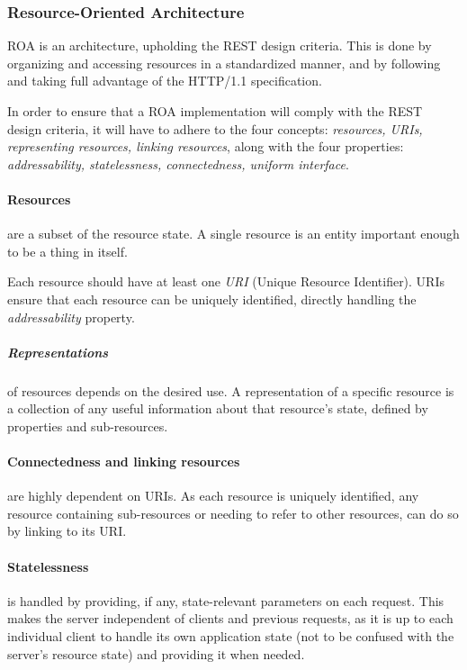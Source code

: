 \subsubsection{Resource-Oriented Architecture}
ROA is an architecture, upholding the REST design criteria.
This is done by organizing and accessing resources in a standardized manner, and by following and taking full advantage of the HTTP/1.1 specification.

In order to ensure that a ROA implementation will comply with the REST design criteria, it will have to adhere to the four concepts: \textit{resources, URIs, representing resources, linking resources}, along with the four properties: \textit{addressability, statelessness, connectedness, uniform interface}.\cite[Chapter 4,]{restful_web_services}

\paragraph{Resources} are a subset of the resource state.
A single resource is an entity important enough to be a thing in itself.

Each resource should have at least one \textit{URI} (Unique Resource Identifier).
URIs ensure that each resource can be uniquely identified, directly handling the \textit{addressability} property.

\subparagraph{Representations} of resources depends on the desired use.
A representation of a specific resource is a collection of any useful information about that resource's state, defined by properties and sub-resources.

\paragraph{Connectedness and linking resources} are highly dependent on URIs.
As each resource is uniquely identified, any resource containing sub-resources or needing to refer to other resources, can do so by linking to its URI. 

\paragraph{Statelessness} is handled by providing, if any, state-relevant parameters on each request.
This makes the server independent of clients and previous requests, as it is up to each individual client to handle its own application state (not to be confused with the server's resource state) and providing it when needed.

